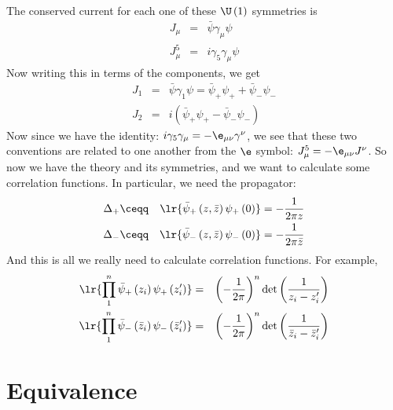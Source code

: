 \documentclass{booc}
\begin{document}
The conserved current for each one of these $\U\left( 1 \right)$ symmetries is
\begin{eqnarray}
J_\mu &=& \bar \psi \gamma_\mu \psi\\
J_\mu^5 &=&  i \gamma_5 \gamma_\mu \psi
\end{eqnarray}
Now writing this in terms of the components, we get
\begin{eqnarray}
J_1 &=&  \bar \psi \gamma_1 \psi = \bar \psi_+ \psi_+ + \bar \psi_- \psi_-\\
J_2 &=&  i \left( \bar \psi_+ \psi_+ - \bar \psi_- \psi_- \right)
\end{eqnarray}
Now since we have the identity:
$i \gamma_5 \gamma_\mu = - \e_{\mu\nu} \gamma^\nu$,
we see that these two conventions are related to one another from the $\e$ symbol:
$J_\mu^5 = -\e_{\mu\nu} J^\nu$.
So now we have the theory and its symmetries, and we want to 
calculate some correlation functions. 
In particular, we need the propagator:
\begin{eqnarray}
\Delta_+ &\ceqq&
\lr{\bar \psi_+ \left( z, \bar z \right) \psi_+\left( 0 \right)}
=  - \frac{1}{2\pi z}
\\
\Delta_- &\ceqq & \lr{\bar \psi_-\left( z , \bar z \right)
\psi_-\left( 0 \right)} = -\frac{1}{2\pi \bar{z}}
\end{eqnarray}
And this is all we really need to calculate correlation functions.
For example, 
\begin{eqnarray}
\lr{\prod_1^n \bar \psi_+\left( z_i \right)
\psi_+\left( z_i ' \right)}
&=& \left( -\frac{1}{2\pi} \right)^n
\det\left( 
\frac{1}{z_i - z_i'}
\right)
\\
\lr{\prod_1^n \bar \psi_-\left( \bar z_i \right)
\psi_-\left( \bar z_i ' \right)}
&=& \left( -\frac{1}{2\pi} \right)^n
\det\left( 
\frac{1}{\bar z_i - \bar z_i'}
\right)
\label{eqn:fermi_endpoint_functions}
\end{eqnarray}


\section{Equivalence}
\end{document}
